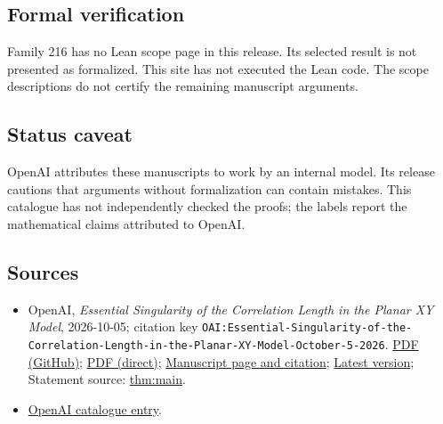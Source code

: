 \documentclass[11pt]{article}
\begin{document}
\subsection{Formal verification}
Family 216 has no Lean scope page in this release. Its selected result is not presented as formalized. This site has not executed the Lean code. The scope descriptions do not certify the remaining manuscript arguments.

\subsection{Status caveat}
OpenAI attributes these manuscripts to work by an internal model. Its release cautions that arguments without formalization can contain mistakes. This catalogue has not independently checked the proofs; the labels report the mathematical claims attributed to OpenAI.

\subsection{Sources}
\begin{itemize}
\item OpenAI, \emph{Essential Singularity of the Correlation Length in the Planar XY Model}, 2026-10-05; citation key \texttt{OAI:Essential-Singularity-of-the-Correlation-Length-in-the-Planar-XY-Model-October-5-2026}. \href{https://github.com/openai/math/blob/adc7f1241b42e322a6451854ab7e4b4c146bf78a/preprints/Essential-Singularity-of-the-Correlation-Length-in-the-Planar-XY-Model-October-5-2026/paper.pdf}{PDF (GitHub)}; \href{https://github.com/openai/math/raw/adc7f1241b42e322a6451854ab7e4b4c146bf78a/preprints/Essential-Singularity-of-the-Correlation-Length-in-the-Planar-XY-Model-October-5-2026/paper.pdf}{PDF (direct)}; \href{https://github.com/openai/math/blob/adc7f1241b42e322a6451854ab7e4b4c146bf78a/preprints/Essential-Singularity-of-the-Correlation-Length-in-the-Planar-XY-Model-October-5-2026/README.md}{Manuscript page and citation}; \href{https://github.com/openai/math/blob/main/preprints/Essential-Singularity-of-the-Correlation-Length-in-the-Planar-XY-Model-October-5-2026/paper.pdf}{Latest version}; Statement source: \href{https://github.com/openai/math/blob/adc7f1241b42e322a6451854ab7e4b4c146bf78a/preprints/Essential-Singularity-of-the-Correlation-Length-in-the-Planar-XY-Model-October-5-2026/build/sections/introduction.tex\#L20}{thm:main}.
\item \href{https://github.com/openai/math/blob/adc7f1241b42e322a6451854ab7e4b4c146bf78a/CONTENTS.md}{OpenAI catalogue entry}.
\end{itemize}
\end{document}
